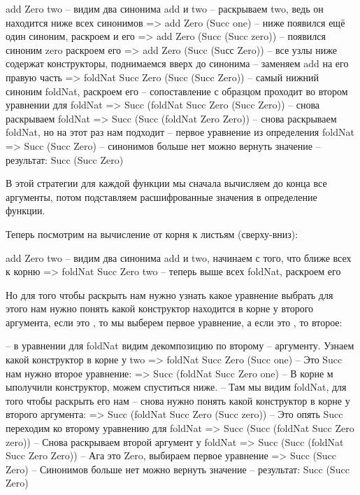 \begin{code}
        add Zero two                    
-- видим два синонима add и two 
-- раскрываем two, ведь он находится ниже всех синонимов
=>      add Zero (Succ one)    
-- ниже появился ещё один синоним, раскроем и его
=>      add Zero (Succ (Succ zero))    
-- появился синоним zero раскроем его
=>      add Zero (Succ (Suсс Zero))
-- все узлы ниже содержат конструкторы, поднимаемся вверх до синонима
-- заменяем add на его правую часть
=>      foldNat Succ Zero (Succ (Succ Zero))  
-- самый нижний синоним foldNat, раскроем его
-- сопоставление с образцом проходит во втором уравнении для foldNat
=>      Succ (foldNat Succ Zero (Succ Zero))
-- снова раскрываем foldNat
=>      Succ (Succ (foldNat Zero Zero))
-- снова раскрываем foldNat, но на этот раз нам подходит
-- первое уравнение из определения foldNat
=>      Succ (Succ Zero)
-- синонимов больше нет можно вернуть значение
-- результат:
        Succ (Succ Zero)
\end{code}

В этой стратегии для каждой функции мы сначала вычисляем до конца
все аргументы, потом подставляем расшифрованные значения в
определение функции.

Теперь посмотрим на вычисление от корня к листьям (сверху-вниз):
    
\begin{code}
        add Zero two
-- видим два синонима add и two, начинаем с того, что ближе всех к корню
=>      foldNat Succ Zero two
-- теперь выше всех foldNat, раскроем его
\end{code}
    
Но для того чтобы раскрыть  нам нужно узнать
какое уравнение выбрать для этого нам нужно понять какой
конструктор находится в корне у второго аргумента, если
это , то мы выберем первое уравнение, а если это
, то второе:

\begin{code}
-- в уравнении для foldNat видим декомпозицию по второму 
-- аргументу. Узнаем какой конструктор в корне у two
=>      foldNat Succ Zero (Succ one)
-- Это Succ нам нужно второе уравнение:
=>      Succ (foldNat Succ Zero one)
-- В корне м ыполучили конструктор, можем спуститься ниже.
-- Там мы видим foldNat, для того чтобы раскрыть его нам
-- снова нужно понять какой конструктор в корне у второго аргумента:
=>      Succ (foldNat Succ Zero (Succ zero))
-- Это опять Succ переходим ко второму уравнению для foldNat
=>      Succ (Succ (foldNat Succ Zero zero))
-- Снова раскрываем второй аргумент у foldNat
=>      Succ (Succ (foldNat Succ Zero Zero))
-- Ага это Zero, выбираем первое уравнение
=>      Succ (Succ Zero)
-- Синонимов больше нет можно вернуть значение
-- результат:
        Succ (Succ Zero)
\end{code}
   
